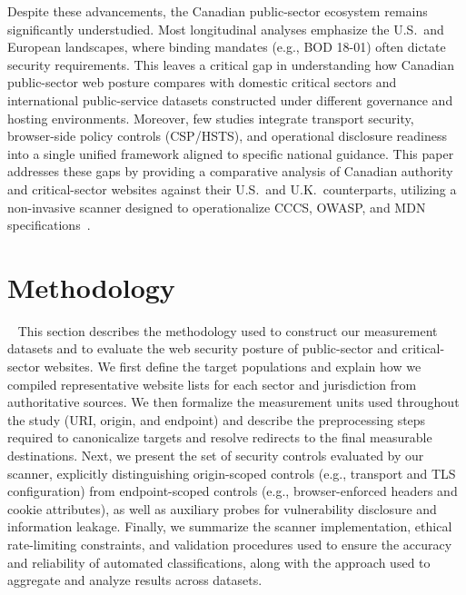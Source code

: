\documentclass[a4paper,fleqn]{cas-sc}
\begin{document}
    Despite these advancements, the Canadian public-sector ecosystem remains significantly understudied. 
    Most longitudinal analyses emphasize the U.S.\ and European landscapes, where binding mandates (e.g., BOD 18-01) often dictate security requirements. 
    This leaves a critical gap in understanding how Canadian public-sector web posture compares with domestic critical sectors and international public-service datasets constructed under different governance and hosting environments.
    Moreover, few studies integrate transport security, browser-side policy controls (CSP/HSTS), and operational disclosure readiness into a single unified framework aligned to specific national guidance. 
    This paper addresses these gaps by providing a comparative analysis of Canadian authority and critical-sector websites against their U.S.\ and U.K.\ counterparts, utilizing a non-invasive scanner designed to operationalize CCCS, OWASP, and MDN specifications~\cite{cccs-itsp-40062,cccs-itsm-60005,owasp_http_security_response_headers,mdn_sts_header}.

\section{Methodology}~\label{sec:methodology}
    This section describes the methodology used to construct our measurement datasets and to evaluate the web security posture of public-sector and critical-sector websites. 
    We first define the target populations and explain how we compiled representative website lists for each sector and jurisdiction from authoritative sources. 
    We then formalize the measurement units used throughout the study (URI, origin, and endpoint) and describe the preprocessing steps required to canonicalize targets and resolve redirects to the final measurable destinations. 
    Next, we present the set of security controls evaluated by our scanner, explicitly distinguishing origin-scoped controls (e.g., transport and TLS configuration) from endpoint-scoped controls (e.g., browser-enforced headers and cookie attributes), as well as auxiliary probes for vulnerability disclosure and information leakage. 
    Finally, we summarize the scanner implementation, ethical rate-limiting constraints, and validation procedures used to ensure the accuracy and reliability of automated classifications, along with the approach used to aggregate and analyze results across datasets.
\end{document}
